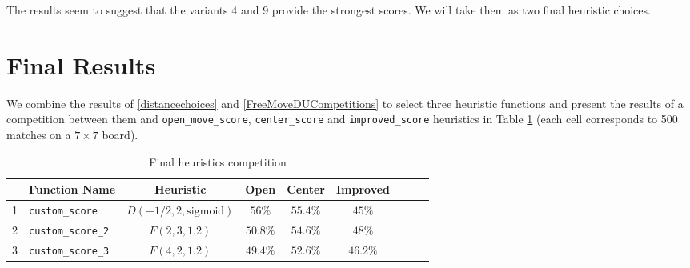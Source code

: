 \documentclass[oneside]{article}   	%
\begin{document}
The results seem to suggest that the variants 4 and 9 provide the strongest scores. We will take them as two final heuristic choices.



\section{Final Results}

We combine the results of \ref{distancechoices} and \ref{FreeMoveDUCompetitions} to select three heuristic functions and present the results of a competition between them and \texttt{open\_move\_score}, \texttt{center\_score} and \texttt{improved\_score} heuristics in Table \ref{FinalCompetition} (each cell corresponds to 500 matches on a $7\times 7$ board).

\begin{table}[htp]
\caption{Final heuristics competition}
\begin{center}
\begin{tabular}{c|lc|cccccc}
   & Function Name & Heuristic & Open & Center & Improved \\
   \hline
1 & \texttt{custom\_score}    & $D(-1/2, 2, \textrm{sigmoid})$ & $56\%$   & $55.4\%$  & $45\%$  \\
2 & \texttt{custom\_score\_2} & $F(2, 3, 1.2)$                 & $50.8\%$ & $54.6\%$  & $48\%$  \\
3 & \texttt{custom\_score\_3} & $F(4, 2, 1.2)$                 & $49.4\%$ & $52.6\%$  & $46.2\%$  
\end{tabular}
\end{center}
\label{FinalCompetition}
\end{table}%
\end{document}
